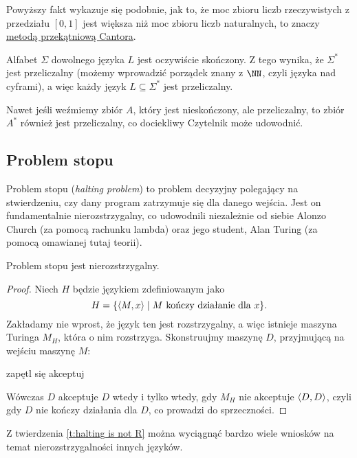 Powyższy fakt wykazuje się podobnie, jak to, że moc zbioru liczb rzeczywistych z przedziału $[0, 1]$ jest większa niż moc zbioru liczb naturalnych, to znaczy \href{https://pl.wikipedia.org/wiki/Metoda_przekątniowa}{metodą przekątniową Cantora}.

\begin{remark}
    Alfabet $\Sigma$ dowolnego języka $L$ jest oczywiście skończony. Z tego wynika, że $\Sigma^*$ jest przeliczalny (możemy wprowadzić porządek znany z $\NN$, czyli języka nad cyframi), a więc każdy język $L \subseteq \Sigma^*$ jest przeliczalny.

    Nawet jeśli weźmiemy zbiór $A$, który jest nieskończony, ale przeliczalny, to zbiór $A^*$ również jest przeliczalny, co dociekliwy Czytelnik może udowodnić.
\end{remark}

\subsection{Problem stopu}
Problem stopu (\textit{halting problem}) to problem decyzyjny polegający na stwierdzeniu, czy dany program zatrzymuje się dla danego wejścia. Jest on fundamentalnie nierozstrzygalny, co udowodnili niezależnie od siebie Alonzo Church (za pomocą rachunku lambda) oraz jego student, Alan Turing (za pomocą omawianej tutaj teorii).

\begin{theorem}\label{t:halting is not R}
    Problem stopu jest nierozstrzygalny.
\end{theorem}
\begin{proof}
    Niech $H$ będzie językiem zdefiniowanym jako
    \[ H = \{\left\langle M, x \right\rangle \mid M \text{ kończy działanie dla } x\}. \]
    Zakładamy nie wprost, że język ten jest rozstrzygalny, a więc istnieje maszyna Turinga $M_H$, która o nim rozstrzyga. Skonstruujmy maszynę $D$, przyjmującą na wejściu maszynę $M$:
    \begin{algorithmic}
            \State zapętl się
        \Else
            \State akceptuj
        \EndIf
    \end{algorithmic}
    Wówczas $D$ akceptuje $D$ wtedy i tylko wtedy, gdy $M_H$ nie akceptuje $\left\langle D, D \right\rangle$, czyli gdy $D$ nie kończy działania dla $D$, co prowadzi do sprzeczności.
\end{proof}

Z twierdzenia \ref{t:halting is not R} można wyciągnąć bardzo wiele wniosków na temat nierozstrzygalności innych języków.

